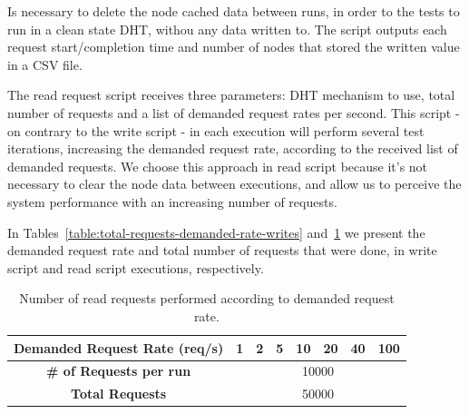 Is necessary to delete the node cached data between runs, in order to the tests to run in a clean state DHT, withou any data written to.
The script outputs each request start/completion time and number of nodes that stored the written value in a CSV file.

The read request script receives three parameters: DHT mechanism to use, total number of requests and a list of demanded request rates per second.
This script - on contrary to the write script - in each execution will perform several test iterations, increasing the demanded request rate, according to the received list of demanded requests.
We choose this approach in read script because it's not necessary to clear the node data between executions, and allow us to perceive the system performance with an increasing number of requests.

In Tables~\ref{table:total-requests-demanded-rate-writes} and~\ref{table:total-requests-demanded-rate-reads} we present the demanded request rate and total number of requests that were done, in write script and read script executions, respectively.

\begin{table}[htb]
\centering
{}
\caption{Number of write requests performed according to demanded request rate.}
\label{table:total-requests-demanded-rate-writes}
\end{table}

\begin{table}[htb]
\centering
\begin{tabular}{cccccccc}
  \textbf{Demanded Request Rate (req/s)} & 1 & 2 & 5 & 10 & 20 & 40 & 100 \\ \hline
  \textbf{\# of Requests per run} & \multicolumn{7}{c}{10000} \\ \hline
  \textbf{Total Requests} & \multicolumn{7}{c}{50000} \\ \hline
\end{tabular}
\caption{Number of read requests performed according to demanded request rate.}
\label{table:total-requests-demanded-rate-reads}
\end{table}

